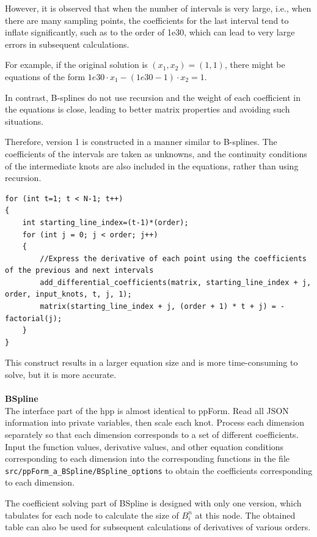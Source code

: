 \documentclass[a4paper]{article}
\begin{document}
However, it is observed that when the number of intervals is very large, i.e., when there are many sampling points, the coefficients for the last interval tend to inflate significantly, such as to the order of 1e30, which can lead to very large errors in subsequent calculations.

For example, if the original solution is $(x_1,x_2)=(1,1)$, there might be equations of the form $1e30 \cdot x_1 - (1e30 - 1) \cdot x_2 = 1$.

In contrast, B-splines do not use recursion and the weight of each coefficient in the equations is close, leading to better matrix properties and avoiding such situations.

Therefore, version 1 is constructed in a manner similar to B-splines. The coefficients of the intervals are taken as unknowns, and the continuity conditions of the intermediate knots are also included in the equations, rather than using recursion.

\begin{verbatim}
for (int t=1; t < N-1; t++)
{
    int starting_line_index=(t-1)*(order);
    for (int j = 0; j < order; j++)
    {
        //Express the derivative of each point using the coefficients of the previous and next intervals
        add_differential_coefficients(matrix, starting_line_index + j, order, input_knots, t, j, 1);
        matrix(starting_line_index + j, (order + 1) * t + j) = -factorial(j);
    }
}
\end{verbatim}

This construct results in a larger equation size and is more time-consuming to solve, but it is more accurate.\\
\\
\textbf{BSpline}\\
The interface part of the hpp is almost identical to ppForm. Read all JSON information into private variables, then scale each knot. Process each dimension separately so that each dimension corresponds to a set of different coefficients. Input the function values, derivative values, and other equation conditions corresponding to each dimension into the corresponding functions in the file \texttt{src/ppForm\_a\_BSpline/BSpline\_options} to obtain the coefficients corresponding to each dimension.

The coefficient solving part of BSpline is designed with only one version, which tabulates for each node to calculate the size of $B^n_{i}$ at this node. The obtained table can also be used for subsequent calculations of derivatives of various orders.
\end{document}
